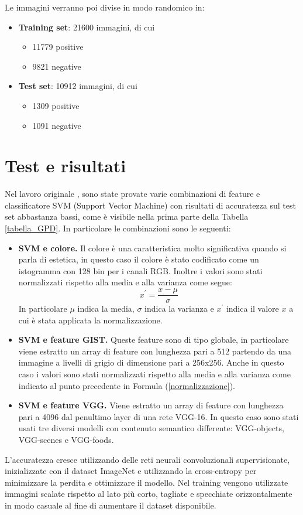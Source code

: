 Le immagini verranno poi divise in modo randomico in:
\begin{itemize}
  \item \textbf{Training set}: 21600 immagini, di cui 
  \begin{itemize}
  \item 11779 positive
  \item 9821 negative
  \end{itemize}
  \item \textbf{Test set}: 10912 immagini, di cui
  \begin{itemize}
  \item 1309 positive
  \item 1091 negative
  \end{itemize}
\end{itemize}

\section{Test e risultati}
Nel lavoro originale \cite{sheng2021learning}, sono state provate varie combinazioni di feature e classificatore SVM (Support Vector Machine) con risultati di accuratezza sul test set abbastanza bassi, come è visibile nella prima parte della Tabella \ref{tabella_GPD}. In particolare le combinazioni sono le seguenti:
\begin{itemize}
\item \textbf{SVM e colore.} Il colore è una caratteristica molto significativa quando si parla di estetica, in questo caso il colore è stato codificato come un istogramma con 128 bin per i canali RGB. Inoltre i valori sono stati normalizzati rispetto alla media e alla varianza come segue:
\begin{equation} 
\label{normalizzazione}
x^{'}=\frac{x-\mu}{\sigma}
\end{equation}
In particolare $\mu$ indica la media, $\sigma$ indica la varianza e $x^{'}$ indica il valore $x$ a cui è stata applicata la normalizzazione.
\item \textbf{SVM e feature GIST.} Queste feature sono di tipo globale, in particolare viene estratto un array di feature con lunghezza pari a 512 partendo da una immagine a livelli di grigio di dimensione pari a 256x256. 
Anche in questo caso i valori sono stati normalizzati rispetto alla media e alla varianza come indicato al punto precedente in Formula ({\ref{normalizzazione}}).
\item \textbf{SVM e feature VGG.} Viene estratto un array di feature con lunghezza pari a 4096 dal penultimo layer di una rete VGG-16. In questo caso sono stati usati tre diversi modelli con contenuto semantico differente: VGG-objects, VGG-scenes e VGG-foods.
\end{itemize}
L'accuratezza cresce utilizzando delle reti neurali convoluzionali supervisionate, inizializzate con il dataset ImageNet \cite{deng2009imagenet} e utilizzando la cross-entropy per minimizzare la perdita e ottimizzare il modello. Nel training vengono utilizzate immagini scalate rispetto al lato più corto, tagliate e specchiate orizzontalmente in modo casuale al fine di aumentare il dataset disponibile.

